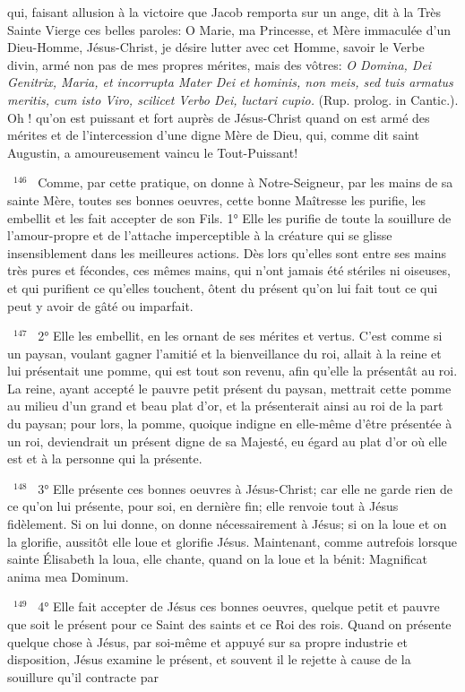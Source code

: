 \documentclass[paper=a5,pagesize=pdftex,fontsize=15pt,headinclude=on,twoside=off]{scrbook}
\newcommand{\negphantom}[1]{\settowidth{\dimen0}{#1}\hspace*{-\dimen0}}
\newcommand{\versenb}[1]{\par \vspace{10pt}~\negphantom{~${}^{#1}$~}${}^{#1}$~}
\newcommand{\latin}[1]{\emph{#1}}
\begin{document}
qui, faisant allusion à la victoire que Jacob remporta sur un ange, dit à la Très Sainte Vierge ces belles paroles: O
Marie, ma Princesse, et Mère immaculée d'un Dieu-Homme, Jésus-Christ, je désire lutter avec cet Homme, savoir
le Verbe divin, armé non pas de mes propres mérites, mais des vôtres: \latin{O Domina, Dei Genitrix, Maria, et
incorrupta Mater Dei et hominis, non meis, sed tuis armatus meritis, cum isto Viro, scilicet Verbo Dei, luctari cupio.}
(Rup. prolog. in Cantic.).
Oh ! qu'on est puissant et fort auprès de Jésus-Christ quand on est armé des mérites et de l'intercession d'une
digne Mère de Dieu, qui, comme dit saint Augustin, a amoureusement vaincu le Tout-Puissant!
\versenb{146} Comme, par cette pratique, on donne à Notre-Seigneur, par les mains de sa sainte Mère, toutes ses bonnes
oeuvres, cette bonne Maîtresse les purifie, les embellit et les fait accepter de son Fils.
1° Elle les purifie de toute la souillure de l'amour-propre et de l'attache imperceptible à la créature qui se glisse
insensiblement dans les meilleures actions. Dès lors qu'elles sont entre ses mains très pures et fécondes, ces
mêmes mains, qui n'ont jamais été stériles ni oiseuses, et qui purifient ce qu'elles touchent, ôtent du présent qu'on
lui fait tout ce qui peut y avoir de gâté ou imparfait.
\versenb{147} 2° Elle les embellit, en les ornant de ses mérites et vertus. C'est comme si un paysan, voulant gagner l'amitié
et la bienveillance du roi, allait à la reine et lui présentait une pomme, qui est tout son revenu, afin qu'elle la
présentât au roi. La reine, ayant accepté le pauvre petit présent du paysan, mettrait cette pomme au milieu d'un
grand et beau plat d'or, et la présenterait ainsi au roi de la part du paysan; pour lors, la pomme, quoique indigne en
elle-même d'être présentée à un roi, deviendrait un présent digne de sa Majesté, eu égard au plat d'or où elle est
et à la personne qui la présente.
\versenb{148} 3° Elle présente ces bonnes oeuvres à Jésus-Christ; car elle ne garde rien de ce qu'on lui présente, pour soi,
en dernière fin; elle renvoie tout à Jésus fidèlement. Si on lui donne, on donne nécessairement à Jésus; si on la
loue et on la glorifie, aussitôt elle loue et glorifie Jésus. Maintenant, comme autrefois lorsque sainte Élisabeth la
loua, elle chante, quand on la loue et la bénit: Magnificat anima mea Dominum.
\versenb{149} 4° Elle fait accepter de Jésus ces bonnes oeuvres, quelque petit et pauvre que soit le présent pour ce Saint
des saints et ce Roi des rois. Quand on présente quelque chose à Jésus, par soi-même et appuyé sur sa propre
industrie et disposition, Jésus examine le présent, et souvent il le rejette à cause de la souillure qu'il contracte par
\end{document}
